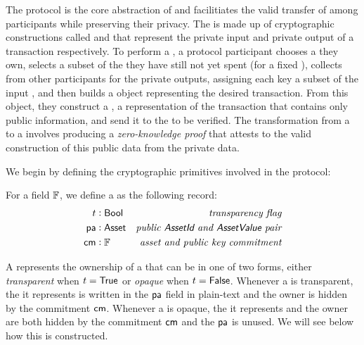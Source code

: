 The \Transfer{} protocol is the core abstraction of \MantaPay{} and facilitiates the valid transfer of  among participants while preserving their privacy. The \Transfer{} is made up of cryptographic constructions called  and  that represent the private input and private output of a transaction respectively. To perform a \Transfer{}, a protocol participant chooses a \SpendingKey{} they own, selects a subset of the  they have still not yet spent (for a fixed \AssetId{}), collects  from other participants for the private outputs, assigning each key a subset of the input , and then builds a \Transfer{} object representing the desired transaction. From this \Transfer{} object, they construct a \TransferPost{}, a representation of the transaction that contains only public information, and send it to the \Ledger{} to be verified. The transformation from a \Transfer{} to a \TransferPost{} involves producing a \emph{zero-knowledge proof} that attests to the valid construction of this public data from the private data.

We begin by defining the cryptographic primitives involved in the \Transfer{} protocol:

\begin{definition}{\UTXO{}}
    For a field ${\mathbb{F}}$, we define a \UTXO{} as the following record:
    \begin{align*}
        t      &: {\textsf{Bool}}  & \textit{transparency flag} \\
        {\textsf{pa}}    &: {\textsf{Asset}} & \textit{public {\textsf{AssetId}}{} and {\textsf{AssetValue}}{} pair} \\
        {\textsf{cm}}    &: {\mathbb{F}}     & \textit{asset and public key commitment}
    \end{align*}

    A \UTXO{} represents the ownership of a \zkAsset{} that can be in one of two forms, either \emph{transparent} when $t = {\textsf{True}}$ or \emph{opaque} when $t = {\textsf{False}}$. Whenever a \UTXO{} is transparent, the \zkAsset{} it represents is written in the ${\textsf{pa}}$ field in plain-text and the owner is hidden by the commitment ${\textsf{cm}}$. Whenever a \UTXO{} is opaque, the \zkAsset{} it represents and the owner are both hidden by the commitment ${\textsf{cm}}$ and the ${\textsf{pa}}$ is unused. We will see below how this \UTXO{} is constructed.
\end{definition}

